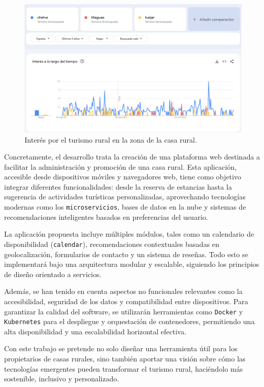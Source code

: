\begin{figure}[h!tb]
    \centering
    \includegraphics[width=1\textwidth]{figs/turismo-tuejar.png}
    \caption{Interés por el turismo rural en la zona de la casa rural.}
    \label{fig:tuejar-turismo}
\end{figure}

Concretamente, el desarrollo trata la creación de una plataforma web destinada a facilitar la administración y promoción de una casa rural. Esta aplicación, accesible desde dispositivos móviles y navegadores web, tiene como objetivo integrar diferentes funcionalidades: desde la reserva de estancias hasta la sugerencia de actividades turísticas personalizadas, aprovechando tecnologías modernas como los \texttt{microservicios}, bases de datos en la nube y sistemas de recomendaciones inteligentes basados en preferencias del usuario.

La aplicación propuesta incluye múltiples módulos, tales como un calendario de disponibilidad (\texttt{calendar}), recomendaciones contextuales basadas en geolocalización, formularios de contacto y un sistema de reseñas. Todo esto se implementará bajo una arquitectura modular y escalable, siguiendo los principios de diseño orientado a servicios.

Además, se han tenido en cuenta aspectos no funcionales relevantes como la accesibilidad, seguridad de los datos y compatibilidad entre dispositivos. Para garantizar la calidad del software, se utilizarán herramientas como \texttt{Docker} y \texttt{Kubernetes} para el despliegue y orquestación de contenedores, permitiendo una alta disponibilidad y una escalabilidad horizontal efectiva.

Con este trabajo se pretende no solo diseñar una herramienta útil para los propietarios de casas rurales, sino también aportar una visión sobre cómo las tecnologías emergentes pueden transformar el turismo rural, haciéndolo más sostenible, inclusivo y personalizado.

